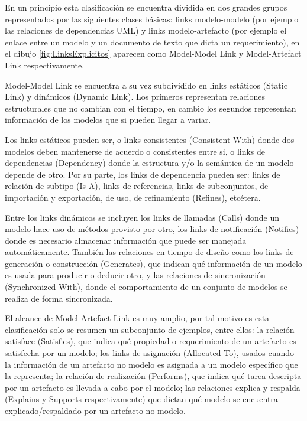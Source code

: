 \documentclass[a4paper,12pt,oneside]{book}
\begin{document}
En un principio esta clasificación se encuentra dividida en dos grandes grupos representados por las siguientes clases básicas: links modelo-modelo (por ejemplo las relaciones de dependencias UML) y links modelo-artefacto (por ejemplo el enlace entre un modelo y un documento de texto que dicta un requerimiento), en el dibujo \ref{fig:LinksExplicitos} aparecen como Model-Model Link y Model-Artefact Link respectivamente.

Model-Model Link se encuentra a su vez subdividido en links estáticos (Static Link) y dinámicos (Dynamic Link). Los primeros representan relaciones estructurales que no cambian con el tiempo, en cambio los segundos representan información de los modelos que si pueden llegar a variar. 

Los links estáticos pueden ser, o links consistentes (Consistent-With) donde dos modelos deben mantenerse de acuerdo o consistentes entre si, o links de dependencias (Dependency) donde la estructura y/o la semántica de un modelo depende de otro. Por su parte, los links de dependencia pueden ser: links de relación de subtipo (Is-A), links de referencias, links de subconjuntos, de importación y exportación, de uso, de refinamiento (Refines), etcétera. 

Entre los links dinámicos se incluyen los links de llamadas (Calls) donde un modelo hace uso de métodos provisto por otro, los links de notificación (Notifies) donde es necesario almacenar información que puede ser manejada automáticamente. También las relaciones en tiempo de diseño como los links de generación o construcción (Generates), que indican qué información de un modelo es usada para producir o deducir otro, y las relaciones de sincronización (Synchronized With), donde el comportamiento de un conjunto de modelos se realiza de forma sincronizada.

El alcance de Model-Artefact Link es muy amplio, por tal motivo es esta clasificación solo se resumen un subconjunto de ejemplos, entre ellos: la relación satisface (Satisfies), que indica qué propiedad o requerimiento de un artefacto es satisfecha por un modelo;  los links de asignación (Allocated-To), usados cuando la información de un artefacto no modelo es asignada a un modelo específico que la representa; la relación de realización (Performs), que indica qué tarea descripta por un artefacto es llevada a cabo por el modelo; las relaciones explica y respalda (Explains y Supports respectivamente) que dictan qué modelo se encuentra explicado/respaldado por un artefacto no modelo.
\end{document}
